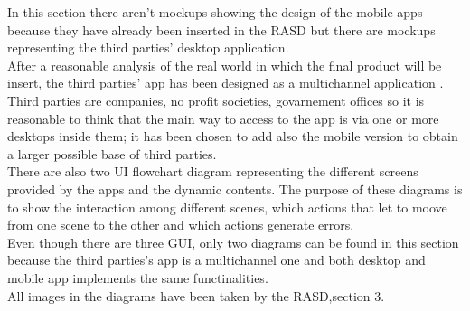 In this section there aren't mockups showing the design of the mobile apps because they have already been inserted in the RASD but there are mockups representing the third parties' desktop application.\\
After a reasonable analysis of the real world in which the final product will be insert, the third parties' app has been designed as a multichannel application . Third parties are companies, no profit societies, govarnement offices so it is reasonable to think that the main way to access to the app is via one or more desktops inside them; it has been chosen to add also the mobile version to obtain a larger possible base of third parties.\\
There are also two UI flowchart diagram representing the different screens provided by the apps and the dynamic contents. The purpose of these diagrams is to show the interaction among different scenes, which actions that let to moove from one scene to the other and which actions generate errors.\\
Even though there are three GUI, only two diagrams can be found in this section because the third parties's app is a multichannel one and both desktop and mobile app implements the same functinalities.\\
All images in the diagrams have been taken by the RASD,section 3.  
